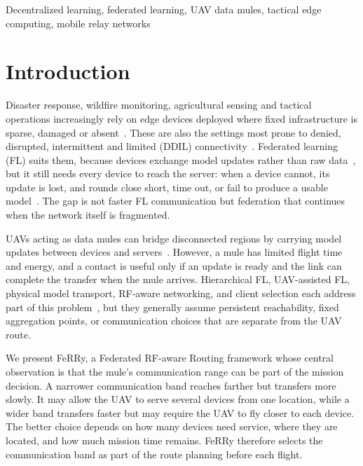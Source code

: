\documentclass[conference]{IEEEtran}
\newcommand{\sysname}{FeRRy}
\begin{document}
\begin{IEEEkeywords}
Decentralized learning, federated learning, UAV data mules, tactical edge computing, mobile relay networks
\end{IEEEkeywords}

\section{Introduction}
\label{sec:introduction}

Disaster response, wildfire monitoring, agricultural sensing and tactical
operations increasingly rely on edge devices deployed where fixed infrastructure
is sparse, damaged or absent~\cite{zeng2016wireless, song2022comprehensive}.
These are also the settings most prone to denied, disrupted, intermittent and
limited (DDIL) connectivity~\cite{gupta2015survey}. Federated learning (FL) suits
them, because devices exchange model updates rather than raw
data~\cite{mcmahan2017communication, kostage2025hifins}, but it still needs every
device to reach the server: when a device cannot, its update is lost, and rounds
close short, time out, or fail to produce a usable model~\cite{li2020federated}.
The gap is not faster FL communication but federation that continues when the
network itself is fragmented.

UAVs acting as data mules can bridge disconnected regions by carrying model
updates between devices and servers~\cite{zhang2025latency, arsalaan2024uavs}.
However, a mule has limited flight time and energy, and a contact is useful only
if an update is ready and the link can complete the transfer when the mule
arrives. Hierarchical FL, UAV-assisted FL, physical model transport, RF-aware
networking, and client selection each address part of this
problem~\cite{liu2020client, lin2023delay, parasnis2023connectivity,
yemini2023robust, mestoukirdi2022uav, bian2025indirect, wang2018deep,
cui2019multi, nishio2019client, lai2021oort}, but they generally assume
persistent reachability, fixed aggregation points, or communication choices
that are separate from the UAV route.

We present \sysname{}, a Federated RF-aware Routing framework whose central
observation is that the mule's communication range can be part of the mission
decision. A narrower communication band reaches farther but transfers more
slowly. It may allow the UAV to serve several devices from one location, while
a wider band transfers faster but may require the UAV to fly closer to each
device. The better choice depends on how many devices need service, where they
are located, and how much mission time remains. \sysname{} therefore selects
the communication band as part of the route planning before each flight.
\end{document}
